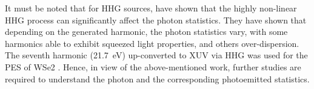 
It must be noted that for \gls{HHG} sources, \citeauthor{gorlachQuantumopticalNatureHigh2020} \cite{gorlachQuantumopticalNatureHigh2020} have shown that the highly non-linear \gls{HHG} process can significantly affect the photon statistics. They have shown that depending on the generated harmonic, the photon statistics vary, with some harmonics able to exhibit squeezed light properties, and others over-dispersion. The seventh harmonic (\qty{21.7}{eV}) up-converted to \gls{XUV} via \gls{HHG} was used for the \gls{PES} of \gls{WSe2} \cite{maklarQuantitativeComparisonTimeflight2020}. Hence, in view of the above-mentioned work, further studies are required to understand the photon and the corresponding photoemitted statistics.

